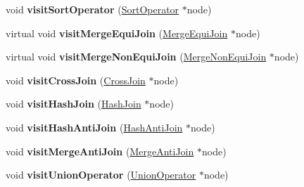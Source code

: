 \begin{DoxyCompactItemize}
\item 
\hypertarget{class_physical_operator_drawing_visitor_af0aaa68b27e6e562744b0c8211a63b9a}{void {\bfseries visit\+Sort\+Operator} (\hyperlink{class_sort_operator}{Sort\+Operator} $\ast$node)}\label{class_physical_operator_drawing_visitor_af0aaa68b27e6e562744b0c8211a63b9a}

\item 
\hypertarget{class_physical_operator_drawing_visitor_a78f01a744a33b84011ddedca236e95e1}{virtual void {\bfseries visit\+Merge\+Equi\+Join} (\hyperlink{class_merge_equi_join}{Merge\+Equi\+Join} $\ast$node)}\label{class_physical_operator_drawing_visitor_a78f01a744a33b84011ddedca236e95e1}

\item 
\hypertarget{class_physical_operator_drawing_visitor_acdfdd3b9f711abff9fb064495e8512e1}{virtual void {\bfseries visit\+Merge\+Non\+Equi\+Join} (\hyperlink{class_merge_non_equi_join}{Merge\+Non\+Equi\+Join} $\ast$node)}\label{class_physical_operator_drawing_visitor_acdfdd3b9f711abff9fb064495e8512e1}

\item 
\hypertarget{class_physical_operator_drawing_visitor_aaeb9fbec796677a5483384cbddd3f827}{void {\bfseries visit\+Cross\+Join} (\hyperlink{class_cross_join}{Cross\+Join} $\ast$node)}\label{class_physical_operator_drawing_visitor_aaeb9fbec796677a5483384cbddd3f827}

\item 
\hypertarget{class_physical_operator_drawing_visitor_a22032e2685059a3221b85bc990fe684e}{void {\bfseries visit\+Hash\+Join} (\hyperlink{class_hash_join}{Hash\+Join} $\ast$node)}\label{class_physical_operator_drawing_visitor_a22032e2685059a3221b85bc990fe684e}

\item 
\hypertarget{class_physical_operator_drawing_visitor_a1825f8934ad3c2267a40a599b13d2a1a}{void {\bfseries visit\+Hash\+Anti\+Join} (\hyperlink{class_hash_anti_join}{Hash\+Anti\+Join} $\ast$node)}\label{class_physical_operator_drawing_visitor_a1825f8934ad3c2267a40a599b13d2a1a}

\item 
\hypertarget{class_physical_operator_drawing_visitor_ab47caea2d0f82662947a0bf7087e0514}{void {\bfseries visit\+Merge\+Anti\+Join} (\hyperlink{class_merge_anti_join}{Merge\+Anti\+Join} $\ast$node)}\label{class_physical_operator_drawing_visitor_ab47caea2d0f82662947a0bf7087e0514}

\item 
\hypertarget{class_physical_operator_drawing_visitor_aeaa1cd49533ed1bb74921262b918bb06}{void {\bfseries visit\+Union\+Operator} (\hyperlink{class_union_operator}{Union\+Operator} $\ast$node)}\label{class_physical_operator_drawing_visitor_aeaa1cd49533ed1bb74921262b918bb06}


\end{DoxyCompactItemize}
